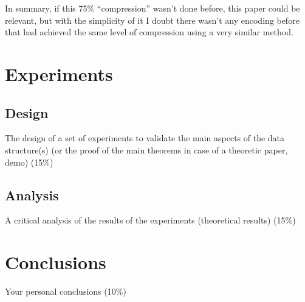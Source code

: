 \documentclass[conference,a4paper]{IEEEtran}
\begin{document}
In summary, if this 75\% ``compression'' wasn't done before, this paper could be relevant, but with the simplicity of it I doubt there wasn't any encoding before that had achieved the same level of compression using a very similar method.

\section{Experiments}
\subsection{Design}
The design of a set of experiments to validate the main aspects of
the data structure(s) (or the proof of the main theorems in case
of a theoretic paper, demo) (15\%)
\subsection{Analysis}
A critical analysis of the results of the experiments (theoretical
results) (15\%)

\section{Conclusions}
Your personal conclusions (10\%)



\end{document}
